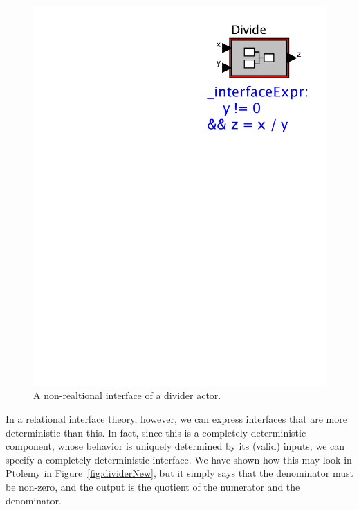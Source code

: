 \documentclass[preprint,11pt]{sigplanconf}
\begin{document}
\begin{figure}[htbp]
\centering
\includegraphics[scale=0.6]{figs/Divide2} %
\caption{A non-realtional interface of a divider actor.}
\label{fig:dividerOld}
\end{figure}

In a relational interface theory, however, we can express interfaces that are
more deterministic than this.  In fact, since this is a completely
deterministic component, whose behavior is uniquely determined by its (valid)
inputs, we can specify a completely deterministic interface.  We have shown how
this may look in Ptolemy in Figure~\ref{fig:dividerNew}, but it simply says
that the denominator must be non-zero, and the output is the quotient of the
numerator and the denominator.
\end{document}
